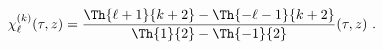 \begin{equation}
\chi^{(k)}_{\ell}(\tau, z) =\frac{\Th{\ell+1}{k+2}-\Th{-\ell-1}{k+2}}
                        {\Th{1}{2}-\Th{-1}{2}}(\tau, z) ~  .
\end{equation}

